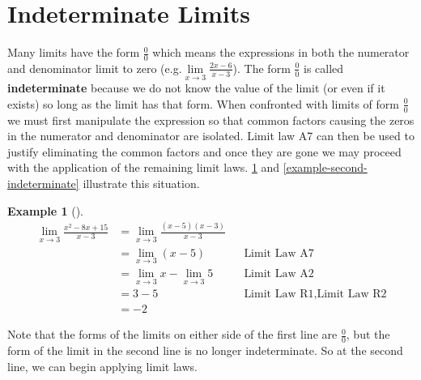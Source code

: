 \documentclass[12pt,]{book}
\newcommand{\terminology}[1]{\textbf{#1}}
\theoremstyle{plain}
\theoremstyle{definition}
\theoremstyle{definition}
\theoremstyle{definition}
\newtheorem{example}[theorem]{Example}
\theoremstyle{definition}
\theoremstyle{definition}
\numberwithin{equation}{section}
\begin{document}
\section[{Indeterminate Limits}]{Indeterminate Limits}\label{section-indeterminate-limits}
Many limits have the form \(\frac{0}{0}\) which means the expressions in both the numerator and denominator limit to zero (e.g.\@\(\lim\limits_{x\to3}\frac{2x-6}{x-3}\)). The form \(\frac{0}{0}\) is called \terminology{indeterminate} because we do not know the value of the limit (or even if it exists) so long as the limit has that form. When confronted with limits of form \(\frac{0}{0}\) we must first manipulate the expression so that common factors causing the zeros in the numerator and denominator are isolated. Limit law A7 can then be used to justify eliminating the common factors and once they are gone we may proceed with the application of the remaining limit laws. \hyperref[example-first-indeterminate]{\ref{example-first-indeterminate}} and \hyperref[example-second-indeterminate]{\ref{example-second-indeterminate}} illustrate this situation.%
\begin{example}[]\label{example-first-indeterminate}
\begin{align*}
\lim_{x\to3}\frac{x^2-8x+15}{x-3}&=\lim_{x\to3}\frac{(x-5)(x-3)}{x-3}\\
&=\lim_{x\to3}(x-5)&&\hyperref[lla7]{\text{Limit Law A7}}\\
&=\lim_{x\to3}x-\lim_{x\to3}5&&\hyperref[lla2]{\text{Limit Law A2}}\\
&=3-5&&\hyperref[llr1]{\text{Limit Law R1}}, \hyperref[llr2]{\text{Limit Law R2}}\\
&=-2
\end{align*}%
\par
Note that the forms of the limits on either side of the first line are \(\frac{0}{0}\), but the form of the limit in the second line is no longer indeterminate. So at the second line, we can begin applying limit laws.%
\end{example}
\end{document}
